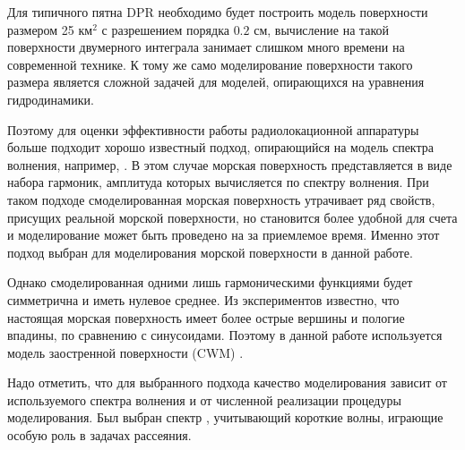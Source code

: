 \documentclass{article}
\begin{document}
Для типичного пятна DPR необходимо будет построить модель поверхности размером
25 км$^2$ с разрешением порядка $0.2$ см, вычисление на такой поверхности
двумерного интеграла занимает слишком много времени на современной технике. К
тому же само моделирование поверхности такого размера является сложной задачей
для моделей, опирающихся на уравнения гидродинамики. 

Поэтому для оценки эффективности работы радиолокационной аппаратуры
больше подходит хорошо известный подход, опирающийся на модель спектра
волнения, например, \cite{longe-higgins}. В этом случае морская поверхность представляется в
виде набора гармоник, амплитуда которых вычисляется по спектру волнения. При
таком подходе смоделированная морская поверхность утрачивает ряд свойств,
присущих реальной морской поверхности, но становится более удобной для счета и
моделирование может быть проведено на за приемлемое время. Именно этот подход выбран для моделирования морской поверхности в данной работе. 

Однако смоделированная одними лишь гармоническими функциями будет симметрична
и иметь нулевое среднее. Из экспериментов 
известно, что
настоящая морская поверхность имеет более острые вершины и пологие впадины, по
сравнению с синусоидами. Поэтому в данной работе используется модель
заостренной поверхности (CWM) \cite{nouguier}.


Надо отметить, что для выбранного подхода
качество моделирования зависит от используемого спектра волнения и от численной
реализации процедуры моделирования. Был выбран спектр \cite{ryabkova},
учитывающий короткие волны, играющие особую роль в задачах рассеяния.
\end{document}
